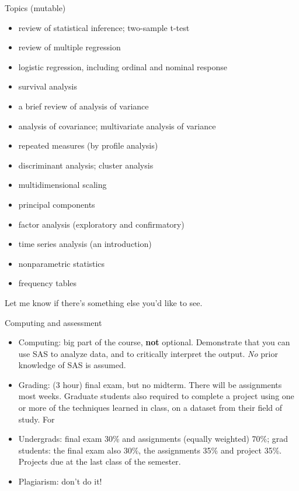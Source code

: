 \documentclass[hyperref={pdfpagelabels=false}]{beamer}
\begin{document}
\begin{frame}{Topics (mutable)}

{\small
      \begin{itemize}
          \item  review of statistical inference; two-sample t-test
          \item  review of multiple regression
          \item  logistic regression, including ordinal and nominal response
          \item survival analysis
          \item a brief review of analysis of variance
          \item analysis of covariance; multivariate analysis of variance
          \item repeated measures (by profile analysis)
          \item  discriminant analysis; cluster analysis
          \item multidimensional scaling
          \item  principal components
          \item  factor analysis (exploratory and confirmatory)
          \item time series analysis (an introduction)
          \item nonparametric statistics
          \item frequency tables
          \end{itemize}
}

Let me know if there's something else you'd like to see.


\end{frame}

\begin{frame}{Computing and assessment}
\begin{itemize}
\item Computing: big part of the course, {\bf not}
  optional. Demonstrate that you can use 
  SAS to analyze data, and to
  critically interpret the output. {\em No} prior knowledge of SAS is assumed.
\item Grading: (3 hour) final exam, but no midterm. There will
  be assignments most weeks. 
  Graduate students also required to
  complete a project using one or more of the techniques learned in
  class, on a dataset from their field of study.  For 
\item Undergrads:
  final exam 30\% and assignments (equally weighted)
  70\%; grad students: the final exam also 30\%, the
  assignments 35\% and project 35\%.
  Projects due at the
  last class of the semester.
    \item Plagiarism: don't do it!
\end{itemize}
\end{frame}
\end{document}
